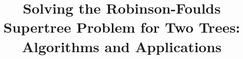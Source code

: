 \documentclass[twocolumn]{bmcart}%
\theoremstyle{mystyle}
\theoremstyle{proofstyle}
\begin{document}
\setlength{\abovedisplayskip}{6pt}
\setlength{\belowdisplayskip}{6pt}
\setlength{\abovedisplayshortskip}{3pt}
\setlength{\belowdisplayshortskip}{3pt}

\begin{frontmatter}

\begin{fmbox}


\title{Solving the Robinson-Foulds Supertree Problem for Two Trees: Algorithms and Applications}


\author[
   addressref={UIUC},                   %
   email={yuxilin51@gmail.com}   %
]{ }
\author[
   addressref={UIUC},
   email={thienle2@illinois.edu}
]{ }
\author[
   addressref={UIUC},
   email={sac@illinois.edu}
]{ }
\author[
   addressref={UIUC},
   email={emolloy2@illinois.edu}
]{ }
\author[
   addressref={UIUC},
   corref={UIUC},
   email={warnow@illinois.edu}
]{ }



\end{fmbox}
\end{frontmatter}
\end{document}

